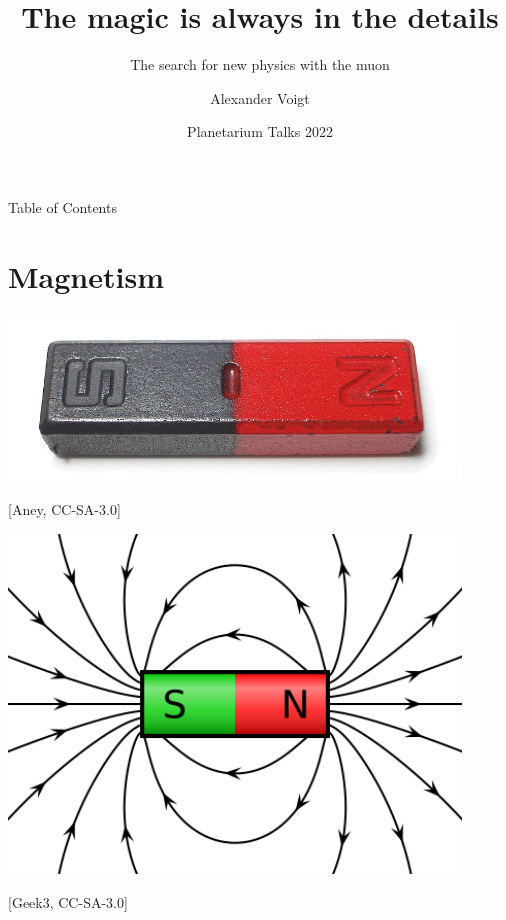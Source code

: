 \documentclass[12pt]{beamer}
\title{The magic is always in the details}
\subtitle{The search for new physics with the muon}
\author[Voigt]{Alexander Voigt}
\institute[HS Flensburg]{Hochschule Flensburg}
\date{Planetarium Talks 2022}
\begin{document}

\begin{frame}
  \titlepage
\end{frame}


\begin{frame}{Table of Contents}
  \tableofcontents
\end{frame}


\section{Magnetism}

\begin{frame}{\insertsection}
  \begin{center}
    \includegraphics[width=0.9\textwidth]{img/bar_magnet_foto}

    \footnotesize [Aney, CC-SA-3.0]
  \end{center}
\end{frame}

\begin{frame}{\insertsection}
  \begin{center}
    \includegraphics[width=0.9\textwidth]{img/bar_magnet}

    \footnotesize [Geek3, CC-SA-3.0]
  \end{center}
\end{frame}
\end{document}
